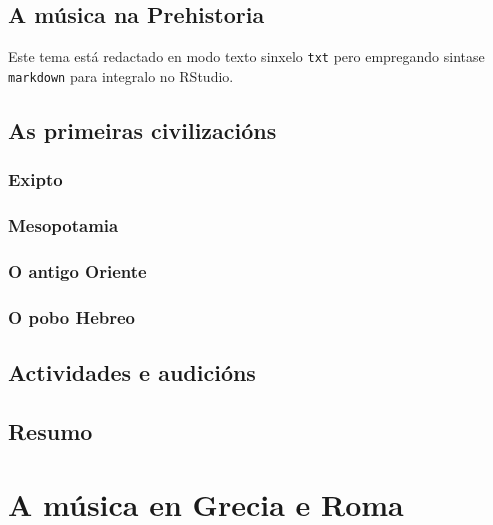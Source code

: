 \documentclass[a4paper, twoside]{templates/ociamthesis}
\begin{document}
\hypertarget{a-muxfasica-na-prehistoria}{%
\section{A música na Prehistoria}\label{a-muxfasica-na-prehistoria}}

Este tema está redactado en modo texto sinxelo \texttt{txt} pero empregando sintase \texttt{markdown} para integralo no RStudio.

\hypertarget{as-primeiras-civilizaciuxf3ns}{%
\section{As primeiras civilizacións}\label{as-primeiras-civilizaciuxf3ns}}

\hypertarget{exipto}{%
\subsection{Exipto}\label{exipto}}

\hypertarget{mesopotamia}{%
\subsection{Mesopotamia}\label{mesopotamia}}

\hypertarget{o-antigo-oriente}{%
\subsection{O antigo Oriente}\label{o-antigo-oriente}}

\hypertarget{o-pobo-hebreo}{%
\subsection{O pobo Hebreo}\label{o-pobo-hebreo}}

\hypertarget{actividades-e-audiciuxf3ns-1}{%
\section*{Actividades e audicións}\label{actividades-e-audiciuxf3ns-1}}

\hypertarget{resumo-1}{%
\section*{Resumo}\label{resumo-1}}

\hypertarget{a-muxfasica-en-grecia-e-roma}{%
\chapter{A música en Grecia e Roma}\label{a-muxfasica-en-grecia-e-roma}}
\end{document}
